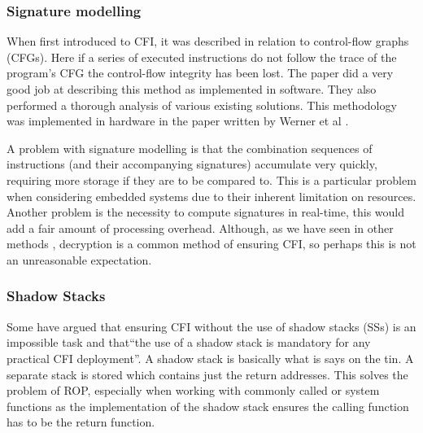 \subsubsection{Signature modelling}
When first introduced to CFI, it was described in relation to control-flow graphs (CFGs). Here if a series of executed instructions do not follow the trace of the program’s CFG the control-flow integrity has been lost. The paper \cite{Yang2013} did a very good job at describing this method as implemented in software. They also performed a thorough analysis of various existing solutions. This methodology was implemented in hardware in the paper written by Werner et al \cite{Werner2016}.

A problem with signature modelling is that the combination sequences of instructions (and their accompanying signatures) accumulate very quickly, requiring more storage if they are to be compared to. This is a particular problem when considering embedded systems due to their inherent limitation on resources. Another problem is the necessity to compute signatures in real-time, this would add a fair amount of processing overhead. Although, as we have seen in other methods \cite{Davi2015} \cite{Lee2019}, decryption is a common method of ensuring CFI, so perhaps this is not an unreasonable expectation.

\subsubsection{Shadow Stacks}
Some \cite{Christoulakis2016} have argued that ensuring CFI without the use of shadow stacks (SSs) is an impossible task and that``the use of a shadow stack is mandatory for any practical CFI deployment''. A shadow stack is basically what is says on the tin. A separate stack is stored which contains just the return addresses. This solves the problem of ROP, especially when working with commonly called or system functions as the implementation of the shadow stack ensures the calling function has to be the return function.

